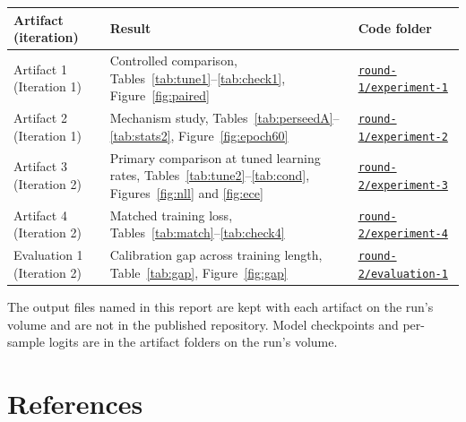 \documentclass[11pt,letterpaper]{article}
\begin{document}
\begin{longtable}{>{\raggedright\arraybackslash}p{4.5cm}>{\raggedright\arraybackslash}p{5.2cm}>{\raggedright\arraybackslash}p{4.5cm}}
\toprule
Artifact (iteration) & Result & Code folder \\
\midrule
\endhead
Artifact 1 (Iteration 1) & Controlled comparison, Tables~\ref{tab:tune1}--\ref{tab:check1}, Figure~\ref{fig:paired} & \href{https://github.com/ai-inventor-papers/ai-invention-d46016-sharpness-aware-training-makes-small/tree/main/round-1/experiment-1}{\texttt{round-1/experiment-1}} \\
Artifact 2 (Iteration 1) & Mechanism study, Tables~\ref{tab:perseedA}--\ref{tab:stats2}, Figure~\ref{fig:epoch60} & \href{https://github.com/ai-inventor-papers/ai-invention-d46016-sharpness-aware-training-makes-small/tree/main/round-1/experiment-2}{\texttt{round-1/experiment-2}} \\
Artifact 3 (Iteration 2) & Primary comparison at tuned learning rates, Tables~\ref{tab:tune2}--\ref{tab:cond}, Figures~\ref{fig:nll} and \ref{fig:ece} & \href{https://github.com/ai-inventor-papers/ai-invention-d46016-sharpness-aware-training-makes-small/tree/main/round-2/experiment-3}{\texttt{round-2/experiment-3}} \\
Artifact 4 (Iteration 2) & Matched training loss, Tables~\ref{tab:match}--\ref{tab:check4} & \href{https://github.com/ai-inventor-papers/ai-invention-d46016-sharpness-aware-training-makes-small/tree/main/round-2/experiment-4}{\texttt{round-2/experiment-4}} \\
Evaluation 1 (Iteration 2) & Calibration gap across training length, Table~\ref{tab:gap}, Figure~\ref{fig:gap} & \href{https://github.com/ai-inventor-papers/ai-invention-d46016-sharpness-aware-training-makes-small/tree/main/round-2/evaluation-1}{\texttt{round-2/evaluation-1}} \\
\bottomrule
\end{longtable}

The output files named in this report are kept with each artifact on the run's volume and are not in the published repository. Model checkpoints and per-sample logits are in the artifact folders on the run's volume.

\section*{References}
\end{document}
